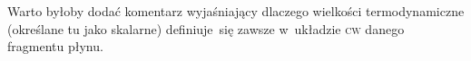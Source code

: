 \documentclass[a4paper,11pt]{article}
\numberwithin{equation}{section}
\begin{document}
\VerSpaceFour





\noindent
{}

\VerSpaceFour




\noindent
{} Warto byłoby dodać komentarz wyjaśniający dlaczego wielkości
termodynamiczne (określane tu jako skalarne) definiuje~się zawsze
w~układzie \textsc{cw} danego fragmentu płynu.

\VerSpaceFour





\noindent
{}





\newpage

\end{document}
